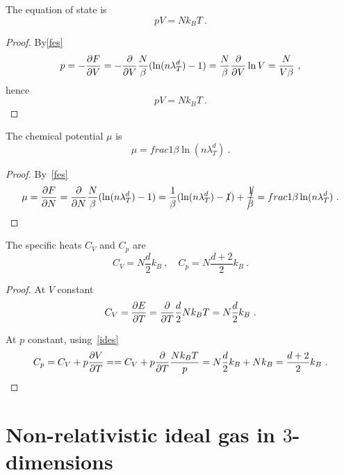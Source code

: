     The equation of state is 
    \begin{equation}\label{ides}
        p V = N k_B T ~.
    \end{equation}
    \begin{proof}
        By\eqref{fes}
        \begin{equation*}
            p = - \frac{\partial F}{\partial V} = - \frac{\partial}{\partial V} \frac{N}{\beta} (\ln (n \lambda_T^d) - 1) = \frac{N}{\beta} \frac{\partial}{\partial V} \ln V = \frac{N}{V \beta} ~,
        \end{equation*}
        hence 
        \begin{equation*}
            p V = N k_B T ~.
        \end{equation*}
    \end{proof}
    
    The chemical potential $\mu$ is 
    \begin{equation*}
        \mu = frac{1}{\beta} \ln (n \lambda_T^d) ~.
    \end{equation*}
    \begin{proof}
        By~\eqref{fes}
        \begin{equation*}
            \mu = \frac{\partial F}{\partial N} = \frac{\partial}{\partial N} \frac{N}{\beta} (\ln (n \lambda_T^d) - 1) = \frac{1}{\beta} (\ln (n \lambda_T^d) - \cancel{1}) + \cancel{\frac{1}{\beta} } = frac{1}{\beta} \ln (n \lambda_T^d) ~.
        \end{equation*}
    \end{proof}

    The specific heats $C_V$ and $C_p$ are 
    \begin{equation*}
        C_V = N \frac{d}{2} k_B ~, \quad C_p = N \frac{d+2}{2} k_B ~. 
    \end{equation*}
    \begin{proof}
        At $V$ constant
        \begin{equation*}
            C_V = \frac{\partial E}{\partial T} = \frac{\partial}{\partial T} \frac{d}{2} N k_B T = N \frac{d}{2} k_B ~.
        \end{equation*}

        At $p$ constant, using~\eqref{ides}
        \begin{equation*}
            C_p = C_V + p \frac{\partial V}{\partial T} = = C_V + p \frac{\partial}{\partial T} \frac{N k_B T}{p} = N \frac{d}{2} k_B + N k_B = \frac{d + 2}{2} k_B ~.
        \end{equation*}
    \end{proof}

\section{Non-relativistic ideal gas in $3$-dimensions}

